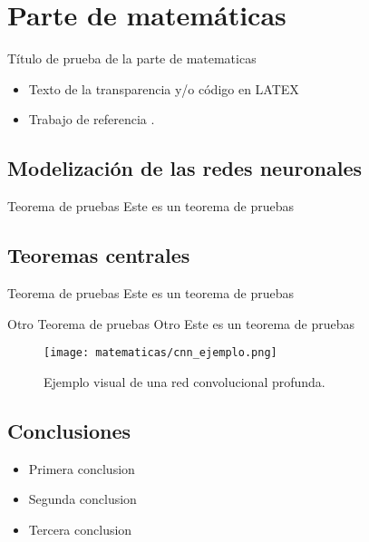 \section{Parte de matemáticas}

\begin{frame}{Título de prueba de la parte de matematicas}
	\begin{itemize}
		\item Texto de la transparencia y/o código en LATEX
		\item Trabajo de referencia \cite{informatica:principal}.
	\end{itemize}
\end{frame}

\subsection{Modelización de las redes neuronales}
\begin{frame}
	\begin{block}{Teorema de pruebas}
		Este es un teorema de pruebas
	\end{block}
\end{frame}

\subsection{Teoremas centrales}
\begin{frame}
	\begin{block}{Teorema de pruebas}
		Este es un teorema de pruebas
	\end{block}

	\begin{block}{Otro Teorema de pruebas}
		Otro Este es un teorema de pruebas
	\end{block}
\end{frame}

\begin{frame}

	\begin{figure}
		\centering
		\texttt{[image: matematicas/cnn\_ejemplo.png]}
		\caption{Ejemplo visual de una red convolucional profunda.}
	\end{figure}

\end{frame}

\subsection{Conclusiones}
\begin{frame}
	\begin{itemize}
		\item Primera conclusion
		\item Segunda conclusion
		\item Tercera conclusion
	\end{itemize}
\end{frame}
